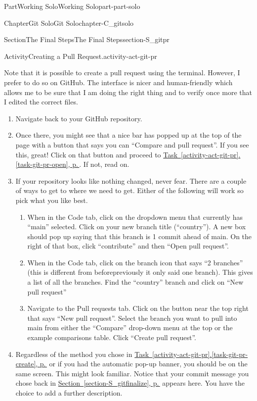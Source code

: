 \documentclass[twoside,10pt,]{book}
\newcommand{\xreffont}{\relax}
\begin{document}
\begin{partptx}{Part}{Working Solo}{}{Working Solo}{}{}{part-part-solo}
\begin{chapterptx}{Chapter}{Git Solo}{}{Git Solo}{}{}{chapter-C_gitsolo}
\begin{sectionptx}{Section}{The Final Steps}{}{The Final Steps}{}{}{section-S_gitpr}
\begin{activity}{Activity}{Creating a Pull Request.}{activity-act-git-pr}
\par
Note that it is possible to create a pull request using the terminal. However, I prefer to do so on GitHub. The interface is nicer and human-friendly which allows me to be sure that I am doing the right thing and to verify once more that I edited the correct files.%
\begin{enumerate}[font=\bfseries,label=(\alph*),ref=\alph*]%
\item{}Navigate back to your GitHub repository.%
\item{}Once there, you might see that a nice bar has popped up at the top of the page with a button that says you can ``Compare and pull request''. If you see this, great! Click on that button and proceed to \hyperref[task-git-pr-open]{Task~{\xreffont\ref{activity-act-git-pr}}.{\xreffont\ref{task-git-pr-open}}, p.\,\pageref{task-git-pr-open}}. If not, read on.%
\item\label{task-git-pr-create}If your repository looks like nothing changed, never fear. There are a couple of ways to get to where we need to get. Either of the following will work so pick what you like best.%
\begin{enumerate}
\item{}When in the Code tab, click on the dropdown menu that currently has ``main'' selected. Click on your new branch title (``country''). A new box should pop up saying that this branch is 1 commit ahead of main. On the right of that box, click ``contribute'' and then ``Open pull request''.%
\item{}When in the Code tab, click on the branch icon that says ``2 branches'' (this is different from before\textellipsis{}previously it only said one branch). This gives a list of all the branches. Find the ``country'' branch and click on ``New pull request''%
\item{}Navigate to the Pull requests tab. Click on the button near the top right that says ``New pull request''. Select the branch you want to pull into main from either the ``Compare'' drop-down menu at the top or the example comparisons table. Click ``Create pull request''.%
\end{enumerate}
%
\item\label{task-git-pr-open}Regardless of the method you chose in \hyperref[task-git-pr-create]{Task~{\xreffont\ref{activity-act-git-pr}}.{\xreffont\ref{task-git-pr-create}}, p.\,\pageref{task-git-pr-create}} or if you had the automatic pop-up banner, you should be on the same screen. This might look familiar. Notice that your commit message you chose back in \hyperref[section-S_gitfinalize]{Section~{\xreffont\ref{section-S_gitfinalize}}, p.\,\pageref{section-S_gitfinalize}} appears here. You have the choice to add a further description.%

\end{enumerate}
\end{activity}
\end{sectionptx}
\end{chapterptx}
\end{partptx}
\end{document}
